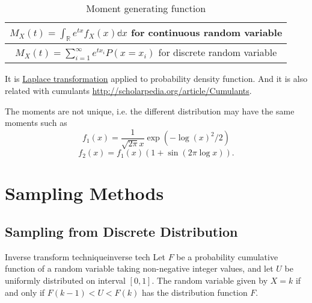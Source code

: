 \documentclass[titlestyle=hang,11pt]{elegantbook}
\begin{document}
\begin{table}[h]
	\centering
	\caption{Moment generating function}
	\begin{tabular}{|c|}
		\hline
		$M_X(t)=\int_{\mathbb{R}}e^{tx}f_X(x)\mathbb{d}x$ for continuous random variable  \\
		\hline
		$M_{X}(t)=\sum_{i=1}^{\infty}e^{tx_{i}}P(x=x_i)$ for discrete random variable  \\
		\hline
	\end{tabular}
\end{table}

It is \href{http://mathworld.wolfram.com/LaplaceTransform.html}{Laplace transformation} applied to probability density function. And it is also related with cumulants \url{http://scholarpedia.org/article/Cumulants}.

The moments are not unique, i.e. the different distribution may have the same moments such as
$${f}_1(x)=\frac{1}{\sqrt{2\pi}x}\exp(-{\log(x)}^2/2)$$
$${f}_2(x)={f}_1(x)(1+\sin(2\pi\log{x})).$$

\section{Sampling Methods}

%

\subsection{Sampling from Discrete Distribution}

\begin{definition}{Inverse transform technique}{inverse tech}
Let $F$ be a probability cumulative function of a random variable taking non-negative integer values, and let $U$ be uniformly distributed on interval $[0, 1]$.
The random variable given by $X=k$ if and only if $F(k-1)<U<F(k)$ has the distribution function $F$.
\end{definition}
\end{document}

